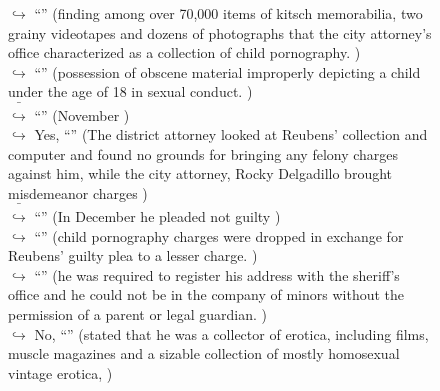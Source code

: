 \documentclass[11pt,a4paper, onecolumn]{article}
\begin{document}
\begin{figure}[t] \small \begin{tcolorbox}[boxsep=0pt,left=5pt,right=0pt,top=2pt,colback = yellow!5] \begin{dialogue}
 \small 
\colorbox{pink!25}{$\hookrightarrow$}
{ ``'' (finding among over 70,000 items of kitsch memorabilia, two grainy videotapes and dozens of photographs that the city attorney's office characterized as a collection of child pornography. ) }
\\
\colorbox{pink!25}{$\hookrightarrow$}
{ ``'' (possession of obscene material improperly depicting a child under the age of 18 in sexual conduct. ) }
\\
\colorbox{pink!25}{ $\bar{\hookrightarrow}$}
{ ``'' (November ) }
\\
\colorbox{pink!25}{$\hookrightarrow$}
\colorbox{red!25}{Yes,}
{ ``'' (The district attorney looked at Reubens' collection and computer and found no grounds for bringing any felony charges against him, while the city attorney, Rocky Delgadillo brought misdemeanor charges ) }
\\
\colorbox{pink!25}{ $\bar{\hookrightarrow}$}
{ ``'' (In December he pleaded not guilty ) }
\\
\colorbox{pink!25}{$\hookrightarrow$}
{ ``'' (child pornography charges were dropped in exchange for Reubens' guilty plea to a lesser charge. ) }
\\
\colorbox{pink!25}{$\hookrightarrow$}
{ ``'' (he was required to register his address with the sheriff's office and he could not be in the company of minors without the permission of a parent or legal guardian. ) }
\\
\colorbox{pink!25}{$\hookrightarrow$}
\colorbox{red!25}{No,}
{ ``'' (stated that he was a collector of erotica, including films, muscle magazines and a sizable collection of mostly homosexual vintage erotica, ) }
\\
 \end{dialogue}\end{tcolorbox}\end{figure}
\end{document}
